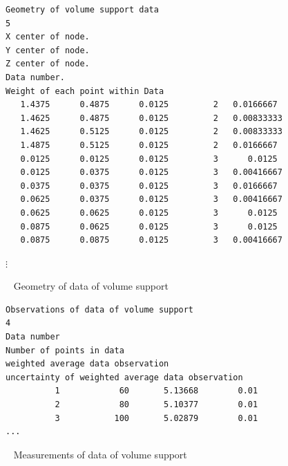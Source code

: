 \documentclass[12t]{article}
\begin{document}
\clearpage
\begin{table}
\begin{Verbatim}
Geometry of volume support data
5
X center of node.
Y center of node.
Z center of node.
Data number.
Weight of each point within Data
   1.4375      0.4875      0.0125         2   0.0166667
   1.4625      0.4875      0.0125         2   0.00833333
   1.4625      0.5125      0.0125         2   0.00833333
   1.4875      0.5125      0.0125         2   0.0166667
   0.0125      0.0125      0.0125         3      0.0125
   0.0125      0.0375      0.0125         3   0.00416667
   0.0375      0.0375      0.0125         3   0.0166667
   0.0625      0.0375      0.0125         3   0.00416667
   0.0625      0.0625      0.0125         3      0.0125
   0.0875      0.0625      0.0125         3      0.0125
   0.0875      0.0875      0.0125         3   0.00416667
\end{Verbatim}
$\vdots$
\caption{\visimprog~ Geometry of data of volume support}
\label{tab:volgeom}
\end{table}


\clearpage
\begin{table}
\begin{Verbatim}
Observations of data of volume support
4
Data number
Number of points in data
weighted average data observation
uncertainty of weighted average data observation
          1            60       5.13668        0.01
          2            80       5.10377        0.01
          3           100       5.02879        0.01
...
\end{Verbatim}
\caption{\visimprog~ Measurements of data of volume support}
\label{tab:volobs}
\end{table}

%
\end{document}
